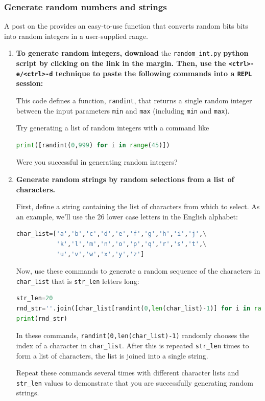 \subsubsection{\howto Generate random numbers and strings}
A post on the  provides an easy-to-use function that converts random bits bits into random integers in a user-supplied range.
\begin{enumerate}
	\item \textbf{To generate random integers, download} the \lstinline{random_int.py} \textbf{python script by clicking on the link in the margin. Then, use the \lstinline{<ctrl>-e/<ctrl>-d} technique to paste the following commands into a \texttt{REPL} session:}
	

	This code defines a function, \lstinline{randint}, that returns a single random integer between the input parameters \texttt{min} and \texttt{max} (including \texttt{min} and \texttt{max}).

	Try generating a list of random integers with a command like
\begin{lstlisting}[language=Python]
print([randint(0,999) for i in range(45)])
\end{lstlisting}
	Were you successful in generating random integers?

	\item \textbf{Generate random strings by random selections from a list of characters.}

	First, define a string containing the list of characters from which to select.
	As an example, we'll use the 26 lower case letters in the English alphabet:
\begin{lstlisting}[language=Python]
char_list=['a','b','c','d','e','f','g','h','i','j',\
           'k','l','m','n','o','p','q','r','s','t',\
           'u','v','w','x','y','z']
\end{lstlisting}
	Now, use these commands to generate a random sequence of the characters in \lstinline{char_list} that is \lstinline{str_len} letters long:
\begin{lstlisting}[language=Python]
str_len=20
rnd_str=''.join([char_list[randint(0,len(char_list)-1)] for i in range(str_len)])
print(rnd_str)
\end{lstlisting}
	In these commands, \lstinline{randint(0,len(char_list)-1)} randomly chooses the index of a character in \lstinline{char_list}.
	After this is repeated \lstinline{str_len} times to form a list of characters, the list is joined into a single string.

	Repeat these commands several times with different character lists and \lstinline{str_len} values to demonstrate that you are successfully generating random strings.

\end{enumerate}



